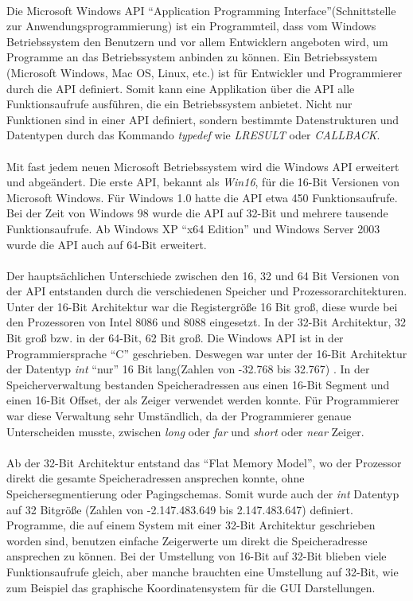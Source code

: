\paragraph{}
Die Microsoft Windows API "`Application Programming Interface"'(Schnittstelle zur Anwendungsprogrammierung) ist ein Programmteil, dass vom Windows Betriebssystem den Benutzern und vor allem Entwicklern angeboten wird, um Programme an das Betriebssystem anbinden zu können. Ein Betriebssystem (Microsoft Windows, Mac OS, Linux, etc.) ist für Entwickler und Programmierer durch die API definiert. Somit kann eine Applikation über die API alle Funktionsaufrufe ausführen, die ein Betriebssystem anbietet. Nicht nur Funktionen sind in einer API definiert, sondern bestimmte Datenstrukturen und Datentypen durch das Kommando \textit{typedef} wie \textit{LRESULT} oder \textit{CALLBACK}.
\\\\
Mit fast jedem neuen Microsoft Betriebssystem wird die Windows API erweitert und abgeändert. Die erste API, bekannt als \textit{Win16}, für die 16-Bit Versionen von Microsoft Windows. Für Windows 1.0 hatte die API etwa 450 Funktionsaufrufe. Bei der Zeit von Windows 98 wurde die API auf 32-Bit und mehrere tausende Funktionsaufrufe. Ab Windows XP "`x64 Edition"' und Windows Server 2003 wurde die API auch auf 64-Bit erweitert.
\\\\
Der hauptsächlichen Unterschiede zwischen den 16, 32 und 64 Bit Versionen von der API entstanden durch die verschiedenen Speicher und Prozessorarchitekturen. Unter der 16-Bit Architektur war die Registergröße 16 Bit groß, diese wurde bei den Prozessoren von Intel 8086 und 8088 eingesetzt. In der 32-Bit Architektur, 32 Bit groß bzw. in der 64-Bit, 62 Bit groß. Die Windows API ist in der Programmiersprache "`C"' geschrieben. Deswegen war unter der 16-Bit Architektur der Datentyp \textit{int} "`nur"' 16 Bit lang(Zahlen von -32.768 bis 32.767) . In der Speicherverwaltung bestanden Speicheradressen aus einen 16-Bit Segment und einen 16-Bit Offset, der als Zeiger verwendet werden konnte. Für Programmierer war diese Verwaltung sehr Umständlich, da der Programmierer genaue Unterscheiden musste, zwischen \textit{long} oder \textit{far} und \textit{short} oder \textit{near} Zeiger. 
\\\\
Ab der 32-Bit Architektur entstand das "`Flat Memory Model"', wo der Prozessor direkt die gesamte Speicheradressen ansprechen konnte, ohne Speichersegmentierung oder Pagingschemas. Somit wurde auch der \textit{int} Datentyp auf 32 Bitgröße (Zahlen von -2.147.483.649 bis 2.147.483.647) definiert. Programme, die auf einem System mit einer 32-Bit Architektur geschrieben worden sind, benutzen einfache Zeigerwerte um direkt die Speicheradresse ansprechen zu können. Bei der Umstellung von 16-Bit auf 32-Bit blieben viele Funktionsaufrufe gleich, aber manche brauchten eine Umstellung auf 32-Bit, wie zum Beispiel das graphische Koordinatensystem für die GUI Darstellungen.
